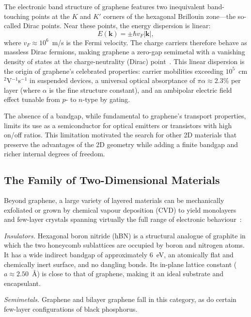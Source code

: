 The electronic band structure of graphene features two inequivalent band-touching points at the $K$ and $K'$ corners of the hexagonal Brillouin zone---the so-called Dirac points.
Near these points, the energy dispersion is linear:
\begin{equation}
    E(\mathbf{k}) = \pm \hbar v_F |\mathbf{k}|,
    \label{eq:dirac_cone}
\end{equation}
where $v_F \approx 10^6$~m/s is the Fermi velocity.
The charge carriers therefore behave as massless Dirac fermions, making graphene a zero-gap semimetal with a vanishing density of states at the charge-neutrality (Dirac) point~\cite{novoselov-2004}.
This linear dispersion is the origin of graphene's celebrated properties: carrier mobilities exceeding $10^5$~cm$^2$V$^{-1}$s$^{-1}$ in suspended devices, a universal optical absorptance of $\pi\alpha \approx 2.3\%$ per layer (where $\alpha$ is the fine structure constant), and an ambipolar electric field effect tunable from $p$- to $n$-type by gating.

The absence of a bandgap, while fundamental to graphene's transport properties, limits its use as a semiconductor for optical emitters or transistors with high on/off ratios.
This limitation motivated the search for other 2D materials that preserve the advantages of the 2D geometry while adding a finite bandgap and richer internal degrees of freedom.

\subsection{The Family of Two-Dimensional Materials}
\label{sec:2D_family}

Beyond graphene, a large variety of layered materials can be mechanically exfoliated or grown by chemical vapour deposition (CVD) to yield monolayers and few-layer crystals spanning virtually the full range of electronic behaviour~\cite{novoselov-2005}:

\textit{Insulators.}
Hexagonal boron nitride (hBN) is a structural analogue of graphite in which the two honeycomb sublattices are occupied by boron and nitrogen atoms.
It has a wide indirect bandgap of approximately 6~eV, an atomically flat and chemically inert surface, and no dangling bonds.
Its in-plane lattice constant ($a \approx 2.50$~\AA) is close to that of graphene, making it an ideal substrate and encapsulant.

\textit{Semimetals.}
Graphene and bilayer graphene fall in this category, as do certain few-layer configurations of black phosphorus.

